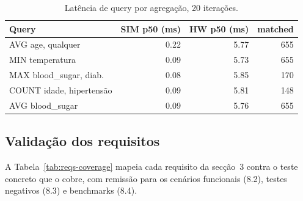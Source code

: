 \begin{table}[H]
\centering
\small
\begin{tabular}{lrrr}
\toprule
Query & SIM p50 (ms) & HW p50 (ms) & matched \\
\midrule
AVG age, qualquer        & 0.22 & 5.77 & 655 \\
MIN temperatura          & 0.09 & 5.73 & 655 \\
MAX blood\_sugar, diab.  & 0.08 & 5.85 & 170 \\
COUNT idade, hipertensão & 0.09 & 5.81 & 148 \\
AVG blood\_sugar         & 0.09 & 5.76 & 655 \\
\bottomrule
\end{tabular}
\caption{Latência de query por agregação, 20 iterações.}
\label{tab:bench-query}
\end{table}

\subsection{Validação dos requisitos}

A Tabela~\ref{tab:reqs-coverage} mapeia cada requisito da secção~3 contra o teste concreto que o cobre, com remissão para os cenários funcionais (8.2), testes negativos (8.3) e benchmarks (8.4).


